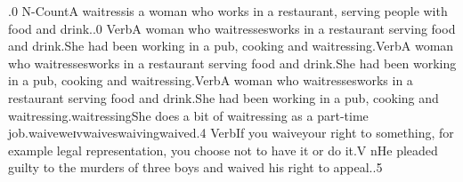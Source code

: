.0 \firstoftypegrammarcategorylastoftypesensearticlesectionletter N-Count A \firstoftypelastoftypewordusedefinitionfirstoftypelastoftypesensearticlesectionletter waitress  is a woman who works in a restaurant, serving people with food and drink..0 \firstoftypegrammarcategorylastoftypesensearticlesectionletter Verb A woman who \firstoftypelastoftypewordusedefinitionfirstoftypelastoftypesensearticlesectionletter waitresses  works in a restaurant serving food and drink.\examplesensearticlesectionletter She had been working in a pub, cooking and waitressing.\firstoftypegrammarcategorylastoftypesensearticlesectionletter Verb A woman who \firstoftypelastoftypewordusedefinitionfirstoftypelastoftypesensearticlesectionletter waitresses  works in a restaurant serving food and drink.\examplesensearticlesectionletter She had been working in a pub, cooking and waitressing.\firstoftypegrammarcategorylastoftypesensearticlesectionletter Verb A woman who \firstoftypelastoftypewordusedefinitionfirstoftypelastoftypesensearticlesectionletter waitresses  works in a restaurant serving food and drink.\examplesensearticlesectionletter She had been working in a pub, cooking and waitressing.\firstoftypeheadwordlastoftypefirstoftypelastoftypesubentryarticlesectionletter wait\firstoftypeheadwordlastoftypefirstoftypelastoftypesubentryarticlesectionletter ress\firstoftypeheadwordlastoftypefirstoftypelastoftypesubentryarticlesectionletter ing\examplefirstoftypelastoftypesubentryarticlesectionletter She does a bit of waitressing as a part-time job.\firstoftypeheadwordlastoftypearticlesectionletter waive\firstoftypelastoftypepronunciationarticlesectionletter w\firstoftypelastoftypestressfirstoftypelastoftypepronunciationarticlesectionletter eɪ\firstoftypelastoftypepronunciationarticlesectionletter v\firstoftypevariantinflectionarticlesectionletter waives\variantinflectionarticlesectionletter waiving\lastoftypevariantinflectionarticlesectionletter waived.4 \firstoftypegrammarcategorylastoftypesensearticlesectionletter Verb If you \firstoftypelastoftypewordusedefinitionfirstoftypelastoftypesensearticlesectionletter waive  your right to something, for example legal representation, you choose not to have it or do it.\exampleusefirstoftypelastoftypesensearticlesectionletter V n\examplesensearticlesectionletter He pleaded guilty to the murders of three boys and waived his right to appeal..5 \firstoftypegrammarcategorylastoftypesensearticlesectionletter 